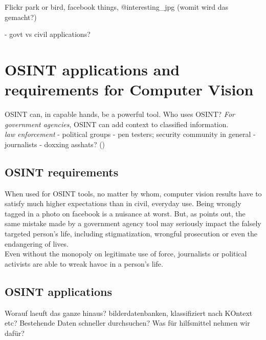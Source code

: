 \documentclass[twoside,a4paper]{article}
\begin{document}
Flickr park or bird, facebook things, @interesting\_jpg (womit wird das gemacht?)

- govt vs civil applications?

\section{OSINT applications and requirements for Computer Vision}
\label{sec:osint_req_app}

OSINT can, in capable hands, be a powerful tool. 
Who uses OSINT?
\emph{For government agencies}, OSINT can add context to classified information.\\
\emph{law enforcement}
- political groups
- pen testers\cite{unauth_access}; security community in general
- journalists
- doxxing asshats? ()

\subsection{OSINT requirements}
\label{subsec:osint_req}

When used for OSINT tools, no matter by whom, computer vision results have to satisfy much higher expectations than in civil, everyday use. Being wrongly tagged in a photo on facebook is a nuisance at worst. But, as \cite{derosa2004data} points out, the same mistake made by a government agency tool may seriously impact the falsely targeted person's life, including stigmatization, wrongful prosecution or even the endangering of lives.\\
Even without the monopoly on legitimate use of force, journalists or political activists are able to wreak havoc in a person's life.


\subsection{OSINT applications}
\label{subsec:osint_app}

Worauf laeuft das ganze hinaus? bilderdatenbanken, klassifiziert nach KOntext etc? Bestehende Daten schneller durchsuchen? Was für hilfsmittel nehmen wir dafür?
\end{document}
